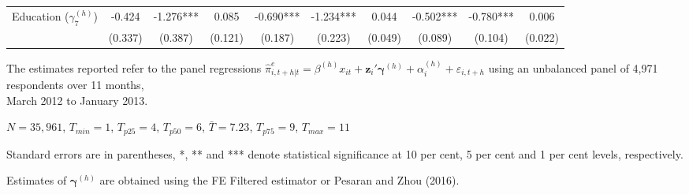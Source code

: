 \begin{table}[!h]
\begin{threeparttable}
\begin{tabular}{|l|ccc|ccc|ccc|}
Education ($\gamma^{(h)}_7$) & -0.424 & -1.276*** & 0.085 & -0.690*** & -1.234*** & 0.044 & -0.502*** & -0.780*** & 0.006 \\ 
 & (0.337) & (0.387) & (0.121)& (0.187) & (0.223) & (0.049)& (0.089) & (0.104) & (0.022) \\ \bottomrule
\end{tabular} 
\begin{tablenotes} 
\item The  estimates reported refer to the panel regressions  $\hat{\pi}^e_{i,t+h|t}=\beta^{(h)} x_{i t}+\mathbf{z}_{i}\prime\mathbf{\gamma }^{(h)}+\alpha_i^{(h)}+\varepsilon_{i,t+h}$  using an unbalanced panel of 4,971 respondents over 11 months,\\  March 2012 to January 2013.
\item $N=35,961$, $T_{min}=1$, $T_{p25}=4$, $T_{p50}=6$, $\bar{T}=7.23$, $T_{p75}=9$,    $T_{max}=11$
\item Standard errors are in parentheses, *, ** and *** denote statistical significance at 10 per cent, 5 per cent and 1 per cent levels, respectively. 
\item Estimates of $\mathbf{\gamma}^{(h)}$ are obtained using the  FE Filtered estimator or Pesaran and Zhou (2016). 
  \end{tablenotes} 
\end{threeparttable} 
\end{table} 
